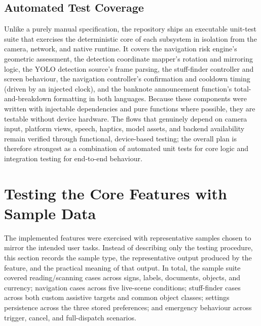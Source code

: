 \documentclass[a4paper]{report}
\begin{document}
\subsection{Automated Test Coverage}
Unlike a purely manual specification, the repository ships an executable unit-test suite that exercises the deterministic core of each subsystem in isolation from the camera, network, and native runtime. It covers the navigation risk engine's geometric assessment, the detection coordinate mapper's rotation and mirroring logic, the YOLO detection source's frame parsing, the stuff-finder controller and screen behaviour, the navigation controller's confirmation and cooldown timing (driven by an injected clock), and the banknote announcement function's total-and-breakdown formatting in both languages. Because these components were written with injectable dependencies and pure functions where possible, they are testable without device hardware. The flows that genuinely depend on camera input, platform views, speech, haptics, model assets, and backend availability remain verified through functional, device-based testing; the overall plan is therefore strongest as a combination of automated unit tests for core logic and integration testing for end-to-end behaviour.

\section{Testing the Core Features with Sample Data}
\noindent The implemented features were exercised with representative samples chosen to mirror the intended user tasks. Instead of describing only the testing procedure, this section records the sample type, the representative output produced by the feature, and the practical meaning of that output. In total, the sample suite covered reading/scanning cases across signs, labels, documents, objects, and currency; navigation cases across five live-scene conditions; stuff-finder cases across both custom assistive targets and common object classes; settings persistence across the three stored preferences; and emergency behaviour across trigger, cancel, and full-dispatch scenarios.
\end{document}
